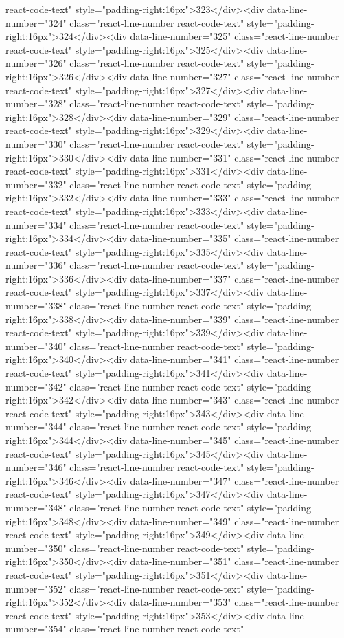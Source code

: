 {{{{{{{react-code-text" style="padding-right:16px">323</div><div data-line-number="324" class="react-line-number react-code-text" style="padding-right:16px">324</div><div data-line-number="325" class="react-line-number react-code-text" style="padding-right:16px">325</div><div data-line-number="326" class="react-line-number react-code-text" style="padding-right:16px">326</div><div data-line-number="327" class="react-line-number react-code-text" style="padding-right:16px">327</div><div data-line-number="328" class="react-line-number react-code-text" style="padding-right:16px">328</div><div data-line-number="329" class="react-line-number react-code-text" style="padding-right:16px">329</div><div data-line-number="330" class="react-line-number react-code-text" style="padding-right:16px">330</div><div data-line-number="331" class="react-line-number react-code-text" style="padding-right:16px">331</div><div data-line-number="332" class="react-line-number react-code-text" style="padding-right:16px">332</div><div data-line-number="333" class="react-line-number react-code-text" style="padding-right:16px">333</div><div data-line-number="334" class="react-line-number react-code-text" style="padding-right:16px">334</div><div data-line-number="335" class="react-line-number react-code-text" style="padding-right:16px">335</div><div data-line-number="336" class="react-line-number react-code-text" style="padding-right:16px">336</div><div data-line-number="337" class="react-line-number react-code-text" style="padding-right:16px">337</div><div data-line-number="338" class="react-line-number react-code-text" style="padding-right:16px">338</div><div data-line-number="339" class="react-line-number react-code-text" style="padding-right:16px">339</div><div data-line-number="340" class="react-line-number react-code-text" style="padding-right:16px">340</div><div data-line-number="341" class="react-line-number react-code-text" style="padding-right:16px">341</div><div data-line-number="342" class="react-line-number react-code-text" style="padding-right:16px">342</div><div data-line-number="343" class="react-line-number react-code-text" style="padding-right:16px">343</div><div data-line-number="344" class="react-line-number react-code-text" style="padding-right:16px">344</div><div data-line-number="345" class="react-line-number react-code-text" style="padding-right:16px">345</div><div data-line-number="346" class="react-line-number react-code-text" style="padding-right:16px">346</div><div data-line-number="347" class="react-line-number react-code-text" style="padding-right:16px">347</div><div data-line-number="348" class="react-line-number react-code-text" style="padding-right:16px">348</div><div data-line-number="349" class="react-line-number react-code-text" style="padding-right:16px">349</div><div data-line-number="350" class="react-line-number react-code-text" style="padding-right:16px">350</div><div data-line-number="351" class="react-line-number react-code-text" style="padding-right:16px">351</div><div data-line-number="352" class="react-line-number react-code-text" style="padding-right:16px">352</div><div data-line-number="353" class="react-line-number react-code-text" style="padding-right:16px">353</div><div data-line-number="354" class="react-line-number react-code-text" }}}}}}}
